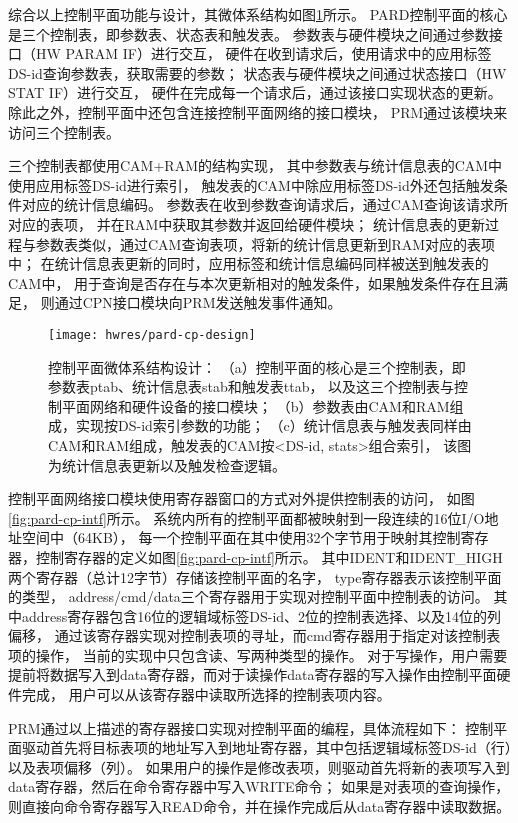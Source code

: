 综合以上控制平面功能与设计，其微体系结构如图\ref{fig:pard-cp-design}所示。
PARD控制平面的核心是三个控制表，即参数表、状态表和触发表。
参数表与硬件模块之间通过参数接口（HW PARAM IF）进行交互，
硬件在收到请求后，使用请求中的应用标签DS-id查询参数表，获取需要的参数；
状态表与硬件模块之间通过状态接口（HW STAT IF）进行交互，
硬件在完成每一个请求后，通过该接口实现状态的更新。
除此之外，控制平面中还包含连接控制平面网络的接口模块，
PRM通过该模块来访问三个控制表。

三个控制表都使用CAM+RAM的结构实现，
其中参数表与统计信息表的CAM中使用应用标签DS-id进行索引，
触发表的CAM中除应用标签DS-id外还包括触发条件对应的统计信息编码。
参数表在收到参数查询请求后，通过CAM查询该请求所对应的表项，
并在RAM中获取其参数并返回给硬件模块；
统计信息表的更新过程与参数表类似，通过CAM查询表项，将新的统计信息更新到RAM对应的表项中；
在统计信息表更新的同时，应用标签和统计信息编码同样被送到触发表的CAM中，
用于查询是否存在与本次更新相对的触发条件，如果触发条件存在且满足，
则通过CPN接口模块向PRM发送触发事件通知。

\begin{figure}[tb]
  \centering
  \texttt{[image: hwres/pard-cp-design]}
  \caption[控制平面微体系结构设计]{控制平面微体系结构设计：
  （a）控制平面的核心是三个控制表，即参数表ptab、统计信息表stab和触发表ttab，
       以及这三个控制表与控制平面网络和硬件设备的接口模块；
  （b）参数表由CAM和RAM组成，实现按DS-id索引参数的功能；
  （c）统计信息表与触发表同样由CAM和RAM组成，触发表的CAM按<DS-id, stats>组合索引，
       该图为统计信息表更新以及触发检查逻辑。}
  \label{fig:pard-cp-design}
\end{figure}

控制平面网络接口模块使用寄存器窗口的方式对外提供控制表的访问，
如图\ref{fig:pard-cp-intf}所示。
系统内所有的控制平面都被映射到一段连续的16位I/O地址空间中（64KB），
每一个控制平面在其中使用32个字节用于映射其控制寄存器，控制寄存器的定义如图\ref{fig:pard-cp-intf}所示。
其中IDENT和IDENT\_HIGH两个寄存器（总计12字节）存储该控制平面的名字，
type寄存器表示该控制平面的类型，
address/cmd/data三个寄存器用于实现对控制平面中控制表的访问。
其中address寄存器包含16位的逻辑域标签DS-id、2位的控制表选择、以及14位的列偏移，
通过该寄存器实现对控制表项的寻址，而cmd寄存器用于指定对该控制表项的操作，
当前的实现中只包含读、写两种类型的操作。
对于写操作，用户需要提前将数据写入到data寄存器，而对于读操作data寄存器的写入操作由控制平面硬件完成，
用户可以从该寄存器中读取所选择的控制表项内容。

PRM通过以上描述的寄存器接口实现对控制平面的编程，具体流程如下：
控制平面驱动首先将目标表项的地址写入到地址寄存器，其中包括逻辑域标签DS-id（行）以及表项偏移（列）。
如果用户的操作是修改表项，则驱动首先将新的表项写入到data寄存器，然后在命令寄存器中写入WRITE命令；
如果是对表项的查询操作，则直接向命令寄存器写入READ命令，并在操作完成后从data寄存器中读取数据。

